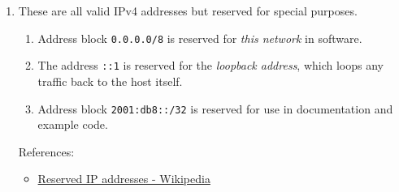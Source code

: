 \documentclass[12pt, a4paper]{article}
\begin{document}
\begin{enumerate}
    \item These are all valid IPv4 addresses but reserved for special purposes.
    \begin{enumerate}
      \item Address block \verb|0.0.0.0/8| is reserved for \textit{this network}
        in software.
      \item The address \verb|::1| is reserved for the \textit{loopback
        address}, which loops any traffic back to the host itself.
      \item Address block \verb|2001:db8::/32| is reserved for use in
        documentation and example code.
    \end{enumerate}
    References:
    \begin{itemize}
      \item \href{https://en.wikipedia.org/wiki/Reserved_IP_addresses}{Reserved IP addresses - Wikipedia}
    \end{itemize}


\end{enumerate}
\end{document}
